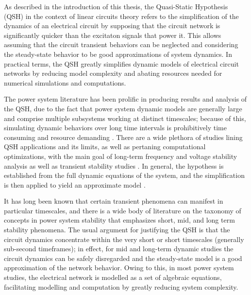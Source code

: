 	As described in the introduction of this thesis, the Quasi-Static Hypothesis (QSH) in the context of linear circuits theory refers to the simplification of the dynamics of an electrical circuit by supposing that the circuit network is significantly quicker than the excitaton signals that power it. This allows assuming that the circuit transient behaviors can be neglected and considering the steady-state behavior to be good approximations of system dynamics. In practical terms, the QSH greatly simplifies dynamic models of electrical circuit networks by reducing model complexity and abating resources needed for numerical simulations and computations.

	The power system literature has been prolific in producing results and analysis of the QSH, due to the fact that power system dynamic models are generally large and comprise multiple subsystems working at distinct timescales; because of this, simulating dynamic behaviors over long time intervals is prohibitively time consuming and resource demanding . There are a wide plethora of studies lining QSH applications and its limits, as well as pertaning computational optimizations, with the main goal of long-term frequency and voltage stability analysis  as well as transient stability studies . In general, the hypothess is established from the full dynamic equations of the system, and the simplification is then applied to yield an approximate model . 

	It has long been known that certain transient phenomena can manifest in particular timescales, and there is a wide body of literature on the taxonomy of concepts in power system stability  that emphasizes short, mid, and long term stability phenomena. The usual argument for justifying the QSH is that the circuit dynamics concentrate within the very short or short timescales (generally sub-second timeframes); in effect, for mid and long-term dynamic studies the circuit dynamics can be safely disregarded and the steady-state model is a good approximation of the network behavior. Owing to this, in most power system studies, the electrical network is modelled as a set of algebraic equations, facilitating modelling and computation by greatly reducing system complexity. 

